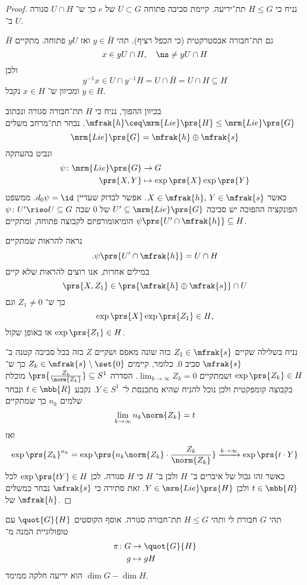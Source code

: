 \documentclass[10pt, twoside]{book}
\newcommand{\Lie}{\mrm{Lie}}
\begin{document}
\begin{proof}
נניח כי
$H \leq G$
תת־יריעה.
קיימת סביבה פתוחה
$U \subset G$
של
$e$
כך ש־%
$U \cap H$
סגורה ב־%
$U$.

$\bar{H}$
גם תת־חבורה אבסטרקטית (כי הכפל רציף). תהי
$y \in \bar{H}$
ואז
$yU$
פתוחה. מתקיים
\[x \in yU \cap H, \quad \ns \neq yU \cap H\]
ולכן
\[y^{-1} x \in U \cap y^{-1} \bar{H} = U \cap \bar{H} = U \cap H \subseteq H\]
ומכיוון ש־%
$x \in H$
נקבל
$y \in H$.

בכיוון ההפוך, נניח כי
$H$
תת־חבורה סגורה ונכתוב
$\mfrak{h} \ceq \Lie\prs{H} \leq \Lie\prs{G}$.
נבחר תת־מרחב משלים
\[\Lie\prs{G} = \mfrak{h} \oplus \mfrak{s}\]
ונביט בהעתקה
\begin{align*}
\psi \colon \Lie\prs{G} &\to G \\
\prs{X,Y} &\mapsto \exp\prs{X} \exp\prs{Y}
\end{align*}
כאשר
$X \in \mfrak{h}, \, Y \in \mfrak{s}$.
אפשר לבדוק שעדיין
$d_0 \psi = \id$.
ממשפט הפונקציה ההפוכה יש סביבה
$U' \subseteq \Lie\prs{G}$
של
$0$
שבה
$\psi \colon U' \riso U \subseteq G$
הומיאומורפיזם לקבוצה פתוחה, ומתקיים
$\psi\prs{U' \cap \mfrak{h}} \subseteq H$.

נראה להראות שמתקיים
\[\text{.} \psi\prs{U' \cap \mfrak{h}} = U \cap H\]
במילים אחרות, אנו רוצים להראות שלא קיים
\[\prs{X, Z_1} \in \prs{\mfrak{h} \oplus \mfrak{s}} \cap U\]
כך ש־%
$Z_1 \neq 0$
וגם
\[\exp\prs{X} \exp\prs{Z_1} \in H \text{,}\]
או באופן שקול
$\exp\prs{Z_1} \in H$.


נניח בשלילה שקיים
$Z_1 \in \mfrak{s}$
כזה שונה מאפס ושקיים
$Z$
כזה בכל סביבה קטנה ב־%
$\mfrak{s}$
סביב
$0$.
כלומר, קיימים
$Z_k \in \mfrak{s} \setminus \set{0}$
כך ש־%
$\exp\prs{Z_k} \in H$
ושמתקיים
$\lim_{k\to\infty} Z_k = 0$.
הסדרה
$\prs{\frac{Z_k}{\norm{Z_k}}} \subseteq S^1$
מוכלת בקבוצה קומפקטית ולכן נוכל להניח שהיא מתכנסת ל־%
$Y \in S^1$.
נקבע
$t \in \mbb{R}$
ונבחר שלמים
$n_k$
כך שמתקיים
\[\lim_{k\to\infty} n_k \norm{Z_k} = t\]
ואז
\[\exp\prs{Z_k}^{n_k} = \exp\prs{n_k \norm{Z_k} \cdot \frac{Z_k}{\norm{Z_k}}} \xrightarrow{k\to\infty} \exp\prs{t \cdot Y}\]
כאשר זהו גבול של איברים ב־%
$H$
ולכן ב־%
$H$
כי
$H$
סגורה.
לכן
$\exp\prs{tY} \in H$
לכל
$t \in \mbb{R}$
ולכן
$Y \in \Lie\prs{H}$.
זאת סתירה כי
$\mfrak{s}$
נבחר כמשלים של
$\mfrak{h}$.
\end{proof}

\begin{corollary}
תהי
$G$
חבורת לי ותהי
$H \leq G$
תת־חבורה סגורה. אוסף הקוסטים
$\quot{G}{H}$
עם טופולוגיית המנה מ־
\begin{align*}
\pi \colon G &\to \quot{G}{H} \\
g &\mapsto gH
\end{align*}
הוא יריעה חלקה ממימד
$\dim G - \dim H$.
\end{corollary}
\end{document}
